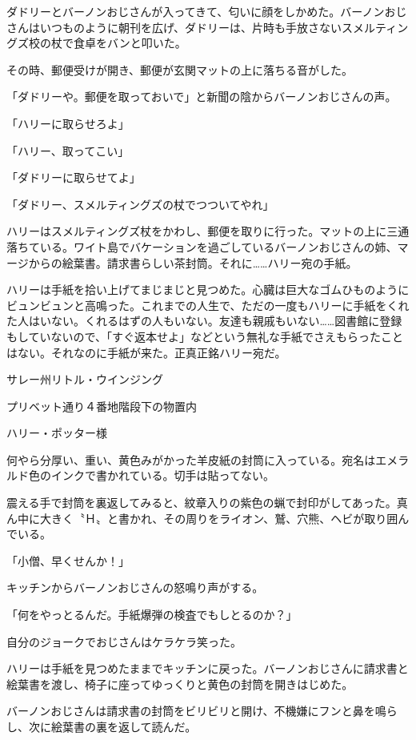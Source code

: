 \documentclass[10pt,a4paper]{article}
\begin{document}
\begin{CJK}{UTF8}{min}
ダドリーとバーノンおじさんが入ってきて、匂いに顔をしかめた。バーノンおじさんはいつものように朝刊を広げ、ダドリーは、片時も手放さないスメルティングズ校の杖で食卓をバンと叩いた。

その時、郵便受けが開き、郵便が玄関マットの上に落ちる音がした。

「ダドリーや。郵便を取っておいで」と新聞の陰からバーノンおじさんの声。

「ハリーに取らせろよ」

「ハリー、取ってこい」

「ダドリーに取らせてよ」

「ダドリー、スメルティングズの杖でつついてやれ」

ハリーはスメルティングズ杖をかわし、郵便を取りに行った。マットの上に三通落ちている。ワイト島でバケーションを過ごしているバーノンおじさんの姉、マージからの絵葉書。請求書らしい茶封筒。それに……ハリー宛の手紙。

ハリーは手紙を拾い上げてまじまじと見つめた。心臓は巨大なゴムひものようにビュンビュンと高鳴った。これまでの人生で、ただの一度もハリーに手紙をくれた人はいない。くれるはずの人もいない。友達も親戚もいない……図書館に登録もしていないので、「すぐ返本せよ」などという無礼な手紙でさえもらったことはない。それなのに手紙が来た。正真正銘ハリー宛だ。



サレー州リトル・ウインジング

プリベット通り４番地階段下の物置内

ハリー・ポッター様



何やら分厚い、重い、黄色みがかった羊皮紙の封筒に入っている。宛名はエメラルド色のインクで書かれている。切手は貼ってない。

震える手で封筒を裏返してみると、紋章入りの紫色の蝋で封印がしてあった。真ん中に大きく〝Ｈ〟と書かれ、その周りをライオン、鷲、穴熊、ヘビが取り囲んでいる。

「小僧、早くせんか！」

キッチンからバーノンおじさんの怒鳴り声がする。

「何をやっとるんだ。手紙爆弾の検査でもしとるのか？」

自分のジョークでおじさんはケラケラ笑った。

ハリーは手紙を見つめたままでキッチンに戻った。バーノンおじさんに請求書と絵葉書を渡し、椅子に座ってゆっくりと黄色の封筒を開きはじめた。

バーノンおじさんは請求書の封筒をビリビリと開け、不機嫌にフンと鼻を鳴らし、次に絵葉書の裏を返して読んだ。


\end{CJK}
\end{document}
